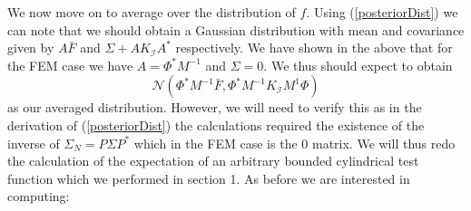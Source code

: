We now move on to average over the distribution of $f$. Using (\ref{posteriorDist}) we can note that we should obtain a Gaussian distribution with mean and covariance given by $A\bar{F}$ and $\Sigma+AK_{\mathcal{I}}A^{*}$ respectively. We have shown in the above that for the FEM case we have $A=\Phi^{*}M^{-1}$ and $\Sigma=0$. We thus should expect to obtain
\begin{equation*}
    \mathcal{N}(\Phi^{*}M^{-1}\bar{F},\Phi^{*}M^{-1}K_{\mathcal{I}}M^{1}\Phi)
\end{equation*}
as our averaged distribution. However, we will need to verify this as in the derivation of (\ref{posteriorDist}) the calculations required the existence of the inverse of $\Sigma_{N}=P\Sigma P^{*}$ which in the FEM case is the $0$ matrix. We will thus redo the calculation of the expectation of an arbitrary bounded cylindrical test function which we performed in section 1. As before we are interested in computing:

